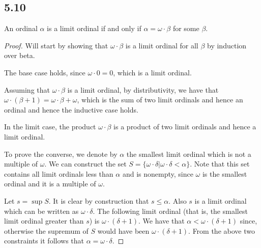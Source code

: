 \subsection*{5.10} An ordinal $\alpha$ is a limit ordinal if and only if $\alpha = \omega \cdot \beta$ for some $\beta$.

\begin{proof}
    Will start by showing that $\omega \cdot \beta$ is a limit ordinal for all $\beta$ by induction over beta.

    The base case holds, since $\omega \cdot 0 = 0$, which is a limit ordinal.

    Assuming that $\omega \cdot \beta$ is a limit ordinal, by distributivity, we have that $\omega \cdot (\beta + 1) = \omega \cdot \beta + \omega$, which is the sum of two limit ordinals and hence an ordinal and hence the inductive case holds.

    In the limit case, the product $\omega \cdot \beta$ is a product of two limit ordinals and hence a limit ordinal.

    \vspace{1em}

    To prove the converse, we denote by $\alpha$ the smallest limit ordinal which is not a multiple of $\omega$. We can construct the set $S = \{\omega \cdot \delta | \omega \cdot \delta < \alpha\}$. Note that this set contains all limit ordinals less than $\alpha$ and is nonempty, since $\omega$ is the smallest ordinal and it is a multiple of $\omega$.

    Let $s = \sup S$. It is clear by construction that $s \leq \alpha$. Also $s$ is a limit ordinal which can be written as $\omega \cdot \delta$. The following limit ordinal (that is, the smallest limit ordinal greater than $s$) is $\omega \cdot (\delta + 1)$. We have that $\alpha < \omega \cdot (\delta + 1)$ since, otherwise the supremum of $S$ would have been $\omega \cdot (\delta + 1)$. From the above two constraints it follows that $\alpha = \omega \cdot \delta$.

    
\end{proof}

